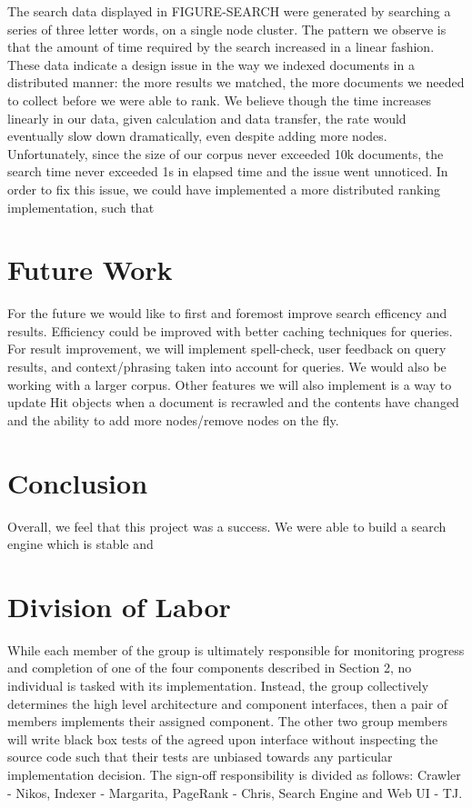 \documentclass[11pt, letterpaper, oneside, twocolumn]{article}
\begin{document}
The search data displayed in FIGURE-SEARCH were generated by searching a series of three letter words, on a single node cluster.
The pattern we observe is that the amount of time required by the search increased in a linear fashion.
These data indicate a design issue in the way we indexed documents in a distributed manner: the more results we matched, the more documents we needed to collect before we were able to rank.
We believe though the time increases linearly in our data, given calculation and data transfer, the rate would eventually slow down dramatically, even despite adding more nodes.
Unfortunately, since the size of our corpus never exceeded 10k documents, the search time never exceeded 1s in elapsed time and the issue went unnoticed.
In order to fix this issue, we could have implemented a more distributed ranking implementation, such that 

\section{Future Work}
\label{sec:future}
For the future we would like to first and foremost improve search efficency and results. 
Efficiency could be improved with better caching techniques for queries. 
For result improvement, we will implement spell-check, user feedback on query results, and context/phrasing taken into account for queries. 
We would also be working with a larger corpus.
Other features we will also implement is a way to update Hit objects when a document is recrawled and the contents have changed and the ability to add more nodes/remove nodes on the fly. 


\section{Conclusion}
\label{sec:conculsion}
Overall, we feel that this project was a success.
We were able to build a search engine which is stable and 

\section{ Division of Labor }
\label{sec:labor}

While each member of the group is ultimately responsible for monitoring progress and completion of one of the four components described in Section 2, no individual is tasked with its implementation.
Instead, the group collectively determines the high level architecture and component interfaces, then a pair of members implements their assigned component.
The other two group members will write black box tests of the agreed upon interface without inspecting the source code such that their tests are unbiased towards any particular implementation decision.
The sign-off responsibility is divided as follows: Crawler - Nikos, Indexer - Margarita, PageRank - Chris, Search Engine and Web UI - TJ.
\end{document}
